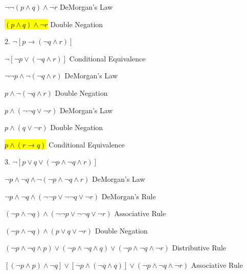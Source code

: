 \documentclass{article} %
\begin{document}
        \tabto{0.98cm}$\neg \neg(p \land q) \land \neg r$ \tabto*{3.7cm} DeMorgan's Law

        \tabto{0.98cm}\hl{$(p \land q) \land \neg r$} \tabto*{3.7cm} Double Negation

        \hspace{0cm}

        2. $\neg[p \rightarrow (\neg q \land r)]$

        \tabto{0.98cm}$\neg[\neg p \lor (\neg q \land r)]$ \tabto*{3.7cm} Conditional Equivalence

        \tabto{0.98cm}$\neg \neg p \land \neg (\neg q \land r)$ \tabto*{3.7cm} DeMorgan's Law

        \tabto{0.98cm}$p \land \neg (\neg q \land r)$ \tabto*{3.7cm} Double Negation

        \tabto{0.98cm}$p \land (\neg \neg q \lor \neg r)$ \tabto*{3.7cm} DeMorgan's Law

        \tabto{0.98cm}$p \land (q \lor \neg r)$ \tabto*{3.7cm} Double Negation

        \tabto{0.98cm}\hl{$p \land (r \rightarrow q)$} \tabto*{3.7cm} Conditional Equivalence

        \hspace{0cm}

        3. $\neg[p \lor q \lor (\neg p \land \neg q \land r)]$

        \hspace{0cm}

        \tabto{0.98cm}$\neg p \land \neg q \land \neg (\neg p \land \neg q \land r)$ \tabto*{9cm} DeMorgan's Law
        
        \tabto{0.98cm}$\neg p \land \neg q \land (\neg \neg p \lor \neg \neg q \lor \neg r)$ \tabto*{9cm} DeMorgan's Rule

        \tabto{0.98cm}$(\neg p \land \neg q) \land (\neg \neg p \lor \neg \neg q \lor \neg r)$ \tabto*{9cm} Associative Rule

        \tabto{0.98cm}$(\neg p \land \neg q) \land (p \lor q \lor \neg r)$ \tabto*{9cm} Double Negation

        \tabto{0.98cm}$(\neg p \land \neg q \land p) \lor (\neg p \land \neg q \land q) \lor (\neg p \land \neg q \land \neg r)$ \tabto*{9cm} Distributive Rule

        \tabto{0.98cm}$[(\neg p \land p) \land \neg q] \lor [\neg p \land (\neg q \land q)] \lor (\neg p \land \neg q \land \neg r)$ \tabto*{9cm} Associative Rule
\end{document}
